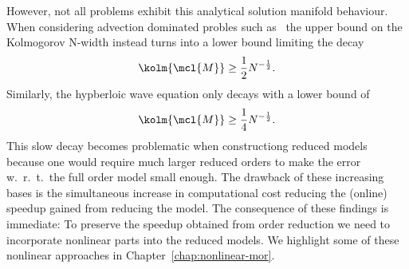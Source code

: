 However, not all problems exhibit this analytical solution manifold behaviour.
When considering advection dominated probles such as~\cite[Section~5.1]{Ohlberger2016} the upper bound on the Kolmogorov N-width instead turns into a lower bound limiting the decay
\begin{equation*}
    \kolm{\mcl{M}} \geq \frac{1}{2} N^{- \frac{1}{2}}.
\end{equation*}
Similarly, the hypberloic wave equation only decays with a lower bound of
\begin{equation*}
    \kolm{\mcl{M}} \geq \frac{1}{4} N^{- \frac{1}{2}}.
\end{equation*}
This slow decay becomes problematic when constructiong reduced models because one would require much larger reduced orders to make the error w.\ r.\ t.\ the full order model small enough.
The drawback of these increasing bases is the simultaneous increase in computational cost reducing the (online) speedup gained from reducing the model.
The consequence of these findings is immediate: To preserve the speedup obtained from order reduction we need to incorporate nonlinear parts into the reduced models.
We highlight some of these nonlinear approaches in Chapter~\ref{chap:nonlinear-mor}.
